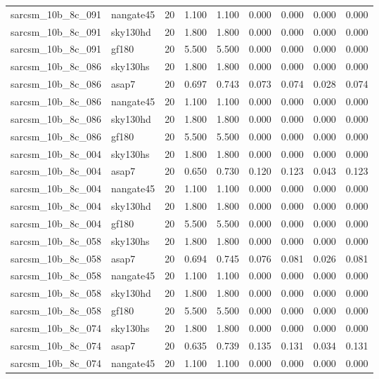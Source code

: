 \begin{tabular}{llrrrrrrr}
sarcsm\_10b\_8c\_091 & nangate45 & 20 & 1.100 & 1.100 & 0.000 & 0.000 & 0.000 & 0.000 \\
sarcsm\_10b\_8c\_091 & sky130hd & 20 & 1.800 & 1.800 & 0.000 & 0.000 & 0.000 & 0.000 \\
sarcsm\_10b\_8c\_091 & gf180 & 20 & 5.500 & 5.500 & 0.000 & 0.000 & 0.000 & 0.000 \\
sarcsm\_10b\_8c\_086 & sky130hs & 20 & 1.800 & 1.800 & 0.000 & 0.000 & 0.000 & 0.000 \\
sarcsm\_10b\_8c\_086 & asap7 & 20 & 0.697 & 0.743 & 0.073 & 0.074 & 0.028 & 0.074 \\
sarcsm\_10b\_8c\_086 & nangate45 & 20 & 1.100 & 1.100 & 0.000 & 0.000 & 0.000 & 0.000 \\
sarcsm\_10b\_8c\_086 & sky130hd & 20 & 1.800 & 1.800 & 0.000 & 0.000 & 0.000 & 0.000 \\
sarcsm\_10b\_8c\_086 & gf180 & 20 & 5.500 & 5.500 & 0.000 & 0.000 & 0.000 & 0.000 \\
sarcsm\_10b\_8c\_004 & sky130hs & 20 & 1.800 & 1.800 & 0.000 & 0.000 & 0.000 & 0.000 \\
sarcsm\_10b\_8c\_004 & asap7 & 20 & 0.650 & 0.730 & 0.120 & 0.123 & 0.043 & 0.123 \\
sarcsm\_10b\_8c\_004 & nangate45 & 20 & 1.100 & 1.100 & 0.000 & 0.000 & 0.000 & 0.000 \\
sarcsm\_10b\_8c\_004 & sky130hd & 20 & 1.800 & 1.800 & 0.000 & 0.000 & 0.000 & 0.000 \\
sarcsm\_10b\_8c\_004 & gf180 & 20 & 5.500 & 5.500 & 0.000 & 0.000 & 0.000 & 0.000 \\
sarcsm\_10b\_8c\_058 & sky130hs & 20 & 1.800 & 1.800 & 0.000 & 0.000 & 0.000 & 0.000 \\
sarcsm\_10b\_8c\_058 & asap7 & 20 & 0.694 & 0.745 & 0.076 & 0.081 & 0.026 & 0.081 \\
sarcsm\_10b\_8c\_058 & nangate45 & 20 & 1.100 & 1.100 & 0.000 & 0.000 & 0.000 & 0.000 \\
sarcsm\_10b\_8c\_058 & sky130hd & 20 & 1.800 & 1.800 & 0.000 & 0.000 & 0.000 & 0.000 \\
sarcsm\_10b\_8c\_058 & gf180 & 20 & 5.500 & 5.500 & 0.000 & 0.000 & 0.000 & 0.000 \\
sarcsm\_10b\_8c\_074 & sky130hs & 20 & 1.800 & 1.800 & 0.000 & 0.000 & 0.000 & 0.000 \\
sarcsm\_10b\_8c\_074 & asap7 & 20 & 0.635 & 0.739 & 0.135 & 0.131 & 0.034 & 0.131 \\
sarcsm\_10b\_8c\_074 & nangate45 & 20 & 1.100 & 1.100 & 0.000 & 0.000 & 0.000 & 0.000 \\

\end{tabular}

